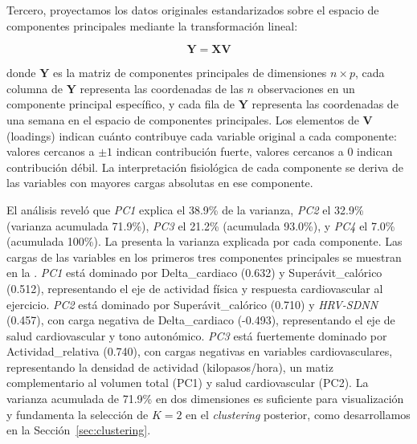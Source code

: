 Tercero, proyectamos los datos originales estandarizados sobre el espacio de componentes principales mediante la transformación lineal:

\begin{equation}
\mathbf{Y} = \mathbf{X}\mathbf{V}
\label{eq:proyeccion_pca}
\end{equation}

donde $\mathbf{Y}$ es la matriz de componentes principales de dimensiones $n \times p$, cada columna de $\mathbf{Y}$ representa las coordenadas de las $n$ observaciones en un componente principal específico, y cada fila de $\mathbf{Y}$ representa las coordenadas de una semana en el espacio de componentes principales. Los elementos de $\mathbf{V}$ (loadings) indican cuánto contribuye cada variable original a cada componente: valores cercanos a $\pm 1$ indican contribución fuerte, valores cercanos a 0 indican contribución débil. La interpretación fisiológica de cada componente se deriva de las variables con mayores cargas absolutas en ese componente.

El análisis reveló que \textit{PC1} explica el 38.9\% de la varianza, \textit{PC2} el 32.9\% (varianza acumulada 71.9\%), \textit{PC3} el 21.2\% (acumulada 93.0\%), y \textit{PC4} el 7.0\% (acumulada 100\%). La  presenta la varianza explicada por cada componente. Las cargas de las variables en los primeros tres componentes principales se muestran en la . \textit{PC1} está dominado por Delta\_cardiaco (0.632) y Superávit\_calórico (0.512), representando el eje de actividad física y respuesta cardiovascular al ejercicio. \textit{PC2} está dominado por Superávit\_calórico (0.710) y \textit{HRV-SDNN} (0.457), con carga negativa de Delta\_cardiaco (-0.493), representando el eje de salud cardiovascular y tono autonómico. \textit{PC3} está fuertemente dominado por Actividad\_relativa (0.740), con cargas negativas en variables cardiovasculares, representando la densidad de actividad (kilopasos/hora), un matiz complementario al volumen total (PC1) y salud cardiovascular (PC2). La varianza acumulada de 71.9\% en dos dimensiones es suficiente para visualización y fundamenta la selección de $K=2$ en el \textit{clustering} posterior, como desarrollamos en la Sección~\ref{sec:clustering}.

